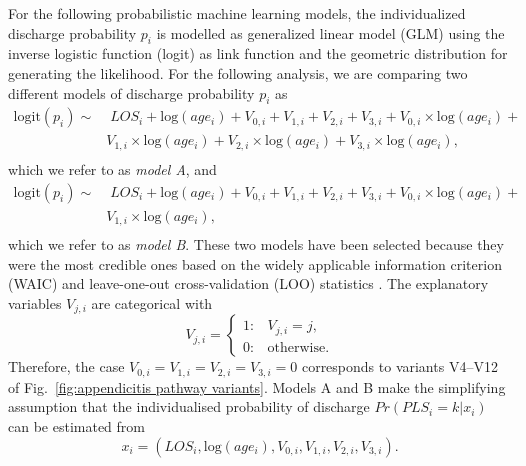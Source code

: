 For the following probabilistic machine learning models, the individualized discharge probability $p_i$ is modelled as generalized linear model (GLM) using the inverse logistic function (logit) as link function and the geometric distribution for generating the likelihood. 
For the following analysis, we are comparing two different models of
discharge probability $p_i$ as
\begin{equation}\label{modelA}
  \begin{split}
  \text{logit}(p_i) \sim & \;LOS_i + \text{log}(age_i) + 
                            V_{0,i} + V_{1,i} + V_{2,i} + V_{3,i} + V_{0,i}\times\text{log}(age_i) +\\
  &   V_{1,i}\times\text{log}(age_i) + V_{2,i}\times\text{log}(age_i) + V_{3,i}\times\text{log}(age_i),\\
  \end{split}
\end{equation}
which we refer to as \textit{model A}, and
\begin{equation}\label{modelB}
  \begin{split}
  \text{logit}(p_i) \sim & \;LOS_i + \text{log}(age_i) +
                                                         V_{0,i} + V_{1,i} + V_{2,i} + V_{3,i} + V_{0,i}\times\text{log}(age_i) +\\
  &    V_{1,i}\times\text{log}(age_i),\\
  \end{split}
\end{equation}
which we refer to as \textit{model B}.
These two models have been selected because they were the most
credible ones based on the widely applicable information criterion
(WAIC) and leave-one-out cross-validation (LOO)  statistics
\cite{Vehtari2017_WAIC_LOO}.
The explanatory variables $V_{j,i}$ are categorical with 
\begin{equation}
V_{j,i} = \begin{cases}
	1: & V_{j,i} = j,\\
        0: & \text{otherwise}.
\end{cases}
\end{equation}
Therefore, the case $V_{0,i}=V_{1,i}=V_{2,i}=V_{3,i}=0$ corresponds to variants V4--V12 of Fig.~\ref{fig:appendicitis pathway variants}.
Models A and B make the simplifying assumption that the individualised
probability of discharge $Pr(PLS_i=k|x_i)$ can be estimated from 
\begin{equation}
x_i = (LOS_i, \text{log}(age_i), V_{0,i}, V_{1, i}, V_{2, i}, V_{3, i}).
\end{equation}
